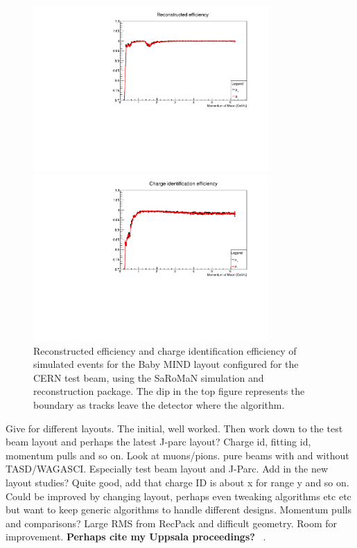 \begin{figure}[h!]
\centering
\includegraphics[width=0.8\textwidth]{figures/oldStudies/FullFitted.pdf}

\includegraphics[width=0.8\textwidth]{figures/oldStudies/FullChargeID.pdf}
\caption{Reconstructed efficiency and charge identification efficiency of simulated events for the Baby MIND layout configured for the CERN test beam, using the SaRoMaN simulation and reconstruction package. The dip in the top figure represents the boundary as tracks leave the detector where the algorithm.}
\label{fig:TestBeamMIND2}
\end{figure}

Give for different layouts. The initial, well worked. Then work down to the test beam layout and perhaps the latest J-parc layout? 
Charge id, fitting id, momentum pulls and so on.
Look at muons/pions. pure beams with and without TASD/WAGASCI. Especially test beam layout and J-Parc.
Add in the new layout studies?
Quite good, add that charge ID is about x for range y and so on.  Could be improved by changing layout, perhaps even tweaking algorithms etc etc but want to keep generic algorithms to handle different designs.
Momentum pulls and comparisons? Large RMS from RecPack and difficult geometry. Room for improvement.
\textbf{Perhaps cite my Uppsala proceedings?} ~\cite{82Uppsala}.
\fi

